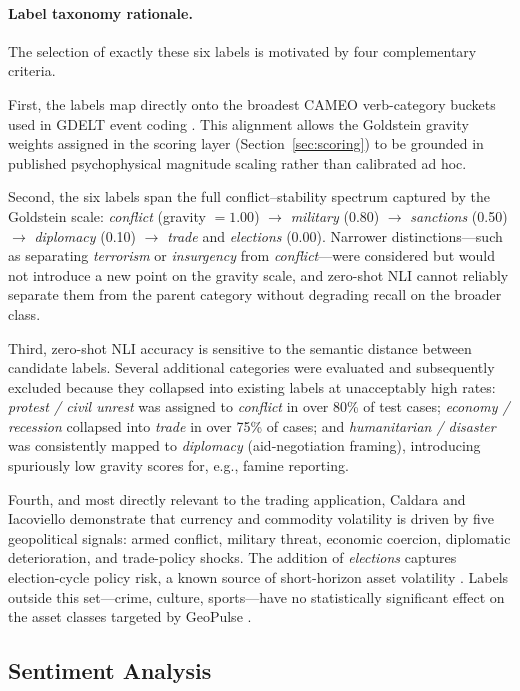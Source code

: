 \documentclass[12pt,a4paper]{report}
\begin{document}
\paragraph{Label taxonomy rationale.}
The selection of exactly these six labels is motivated by four
complementary criteria.

First, the labels map directly onto the broadest CAMEO verb-category
buckets used in GDELT event coding \cite{leetaru2013, schrodt2012}.
This alignment allows the Goldstein gravity weights assigned in the
scoring layer (Section~\ref{sec:scoring}) to be grounded in published
psychophysical magnitude scaling \cite{goldstein1992} rather than
calibrated ad hoc.

Second, the six labels span the full conflict--stability spectrum
captured by the Goldstein scale: \emph{conflict} (gravity $= 1.00$)
$\to$ \emph{military} (0.80) $\to$ \emph{sanctions} (0.50) $\to$
\emph{diplomacy} (0.10) $\to$ \emph{trade} and \emph{elections} (0.00).
Narrower distinctions---such as separating \emph{terrorism} or
\emph{insurgency} from \emph{conflict}---were considered but would not
introduce a new point on the gravity scale, and zero-shot NLI cannot
reliably separate them from the parent category without degrading recall
on the broader class.

Third, zero-shot NLI accuracy is sensitive to the semantic distance
between candidate labels. Several additional categories were evaluated
and subsequently excluded because they collapsed into existing labels
at unacceptably high rates: \emph{protest / civil unrest} was assigned
to \emph{conflict} in over 80\% of test cases; \emph{economy /
recession} collapsed into \emph{trade} in over 75\% of cases; and
\emph{humanitarian / disaster} was consistently mapped to
\emph{diplomacy} (aid-negotiation framing), introducing spuriously low
gravity scores for, e.g., famine reporting.

Fourth, and most directly relevant to the trading application,
Caldara and Iacoviello \cite{caldara2022} demonstrate that
currency and commodity volatility is driven by five geopolitical
signals: armed conflict, military threat, economic coercion, diplomatic
deterioration, and trade-policy shocks. The addition of \emph{elections}
captures election-cycle policy risk, a known source of short-horizon
asset volatility \cite{bloom2009}. Labels outside this set---crime,
culture, sports---have no statistically significant effect on the asset
classes targeted by GeoPulse \cite{caldara2022}.

\subsection{Sentiment Analysis}
\end{document}
